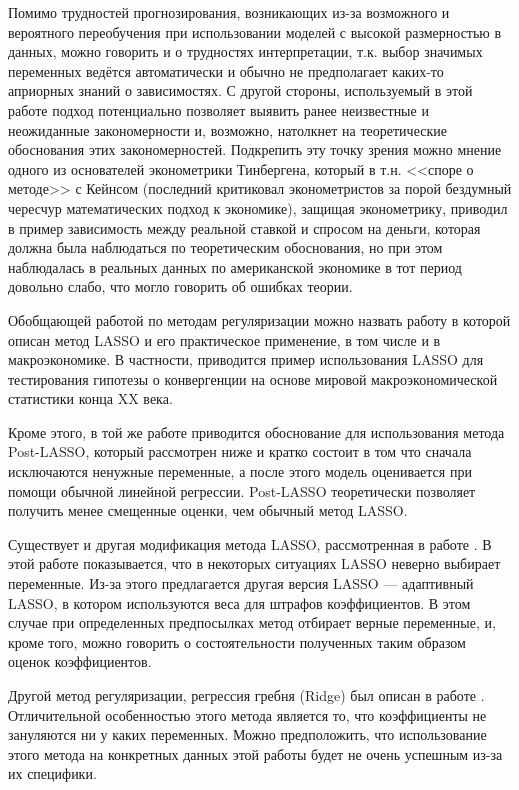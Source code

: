  Помимо трудностей прогнозирования, возникающих из-за возможного и вероятного переобучения при использовании моделей с высокой размерностью в данных, можно говорить и о трудностях интерпретации, т.к. выбор значимых переменных ведётся автоматически и обычно не предполагает каких-то априорных знаний о зависимостях. С другой стороны, используемый в этой работе подход потенциально позволяет выявить ранее неизвестные и неожиданные закономерности и, возможно, натолкнет на теоретические обоснования этих закономерностей. Подкрепить эту точку зрения можно мнение одного из основателей эконометрики Тинбергена, который в т.н. <<споре о методе>> с Кейнсом (последний критиковал эконометристов за порой бездумный чересчур математических подход к экономике), защищая эконометрику, приводил в пример зависимость между реальной ставкой и спросом на деньги, которая должна была наблюдаться по теоретическим обоснования, но при этом наблюдалась в реальных данных по американской экономике в тот период довольно слабо, что могло говорить об ошибках теории.
 
 
 Обобщающей работой по методам регуляризации можно назвать работу \cite{belloni2011high}
 в которой описан метод LASSO и его практическое применение, в том числе и в макроэкономике. В частности, приводится пример использования LASSO для тестирования гипотезы о конвергенции на основе мировой макроэкономической статистики конца XX века.
 
 Кроме этого, в той же работе приводится обоснование для использования метода Post-LASSO, который рассмотрен ниже и кратко состоит в том что сначала исключаются ненужные переменные, а после этого модель оценивается при помощи обычной линейной регрессии. Post-LASSO теоретически позволяет получить менее смещенные оценки, чем обычный метод LASSO.
 
 Существует и другая модификация метода LASSO, рассмотренная в работе \cite{zou2006adaptive}.
 В этой работе показывается, что в некоторых ситуациях LASSO неверно выбирает переменные. Из-за этого предлагается другая версия LASSO --- адаптивный LASSO, в котором используются веса для штрафов коэффициентов. В этом случае при определенных предпосылках метод отбирает верные переменные, и, кроме того, можно говорить о состоятельности полученных таким образом оценок коэффициентов.
 
 
 Другой метод регуляризации, регрессия гребня (Ridge) был описан в работе \cite{hoerl1970ridge}. Отличительной особенностью этого метода является то, что коэффициенты не зануляются ни у каких переменных. Можно предположить, что использование этого метода на конкретных данных этой работы будет не очень успешным из-за их специфики.
 
